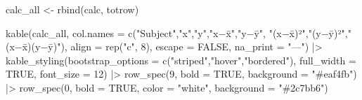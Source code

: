\documentclass[
  12pt,
  letterpaper,
]{book}
\newenvironment{Shaded}{\begin{snugshade}}{\end{snugshade}}
\newcommand{\AttributeTok}[1]{\textcolor[rgb]{0.40,0.45,0.13}{#1}}
\newcommand{\ConstantTok}[1]{\textcolor[rgb]{0.56,0.35,0.01}{#1}}
\newcommand{\DecValTok}[1]{\textcolor[rgb]{0.68,0.00,0.00}{#1}}
\newcommand{\FunctionTok}[1]{\textcolor[rgb]{0.28,0.35,0.67}{#1}}
\newcommand{\NormalTok}[1]{\textcolor[rgb]{0.00,0.23,0.31}{#1}}
\newcommand{\OtherTok}[1]{\textcolor[rgb]{0.00,0.23,0.31}{#1}}
\newcommand{\SpecialCharTok}[1]{\textcolor[rgb]{0.37,0.37,0.37}{#1}}
\newcommand{\StringTok}[1]{\textcolor[rgb]{0.13,0.47,0.30}{#1}}
\begin{document}
\begin{tcolorbox}
\begin{Shaded}
\begin{Highlighting}[]
\NormalTok{calc\_all }\OtherTok{\textless{}{-}} \FunctionTok{rbind}\NormalTok{(calc, totrow)}

\FunctionTok{kable}\NormalTok{(calc\_all,}
      \AttributeTok{col.names =} \FunctionTok{c}\NormalTok{(}\StringTok{"Subject"}\NormalTok{,}\StringTok{"x"}\NormalTok{,}\StringTok{"y"}\NormalTok{,}\StringTok{"x−x̄"}\NormalTok{,}\StringTok{"y−ȳ"}\NormalTok{,}
                    \StringTok{"(x−x̄)²"}\NormalTok{,}\StringTok{"(y−ȳ)²"}\NormalTok{,}\StringTok{"(x−x̄)(y−ȳ)"}\NormalTok{),}
      \AttributeTok{align =} \FunctionTok{rep}\NormalTok{(}\StringTok{"c"}\NormalTok{, }\DecValTok{8}\NormalTok{), }\AttributeTok{escape =} \ConstantTok{FALSE}\NormalTok{, }\AttributeTok{na\_print =} \StringTok{"—"}\NormalTok{) }\SpecialCharTok{|\textgreater{}}
  \FunctionTok{kable\_styling}\NormalTok{(}\AttributeTok{bootstrap\_options =} \FunctionTok{c}\NormalTok{(}\StringTok{"striped"}\NormalTok{,}\StringTok{"hover"}\NormalTok{,}\StringTok{"bordered"}\NormalTok{),}
                \AttributeTok{full\_width =} \ConstantTok{TRUE}\NormalTok{, }\AttributeTok{font\_size =} \DecValTok{12}\NormalTok{) }\SpecialCharTok{|\textgreater{}}
  \FunctionTok{row\_spec}\NormalTok{(}\DecValTok{9}\NormalTok{, }\AttributeTok{bold =} \ConstantTok{TRUE}\NormalTok{, }\AttributeTok{background =} \StringTok{"\#eaf4fb"}\NormalTok{) }\SpecialCharTok{|\textgreater{}}
  \FunctionTok{row\_spec}\NormalTok{(}\DecValTok{0}\NormalTok{, }\AttributeTok{bold =} \ConstantTok{TRUE}\NormalTok{, }\AttributeTok{color =} \StringTok{"white"}\NormalTok{, }\AttributeTok{background =} \StringTok{"\#2c7bb6"}\NormalTok{)}
\end{Highlighting}
\end{Shaded}

\begin{table}[H]

\caption{\label{tbl-ex1-calc}Calculation Table for Correlation and
Regression}

\centering{

\begingroup\fontsize{12}{14}\selectfont

}
\end{table}
\end{tcolorbox}
\end{document}
